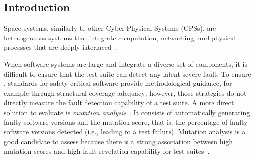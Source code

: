 \subsection{Introduction}

Space systems, similarly to other Cyber Physical Systems (CPSs), are heterogeneous systems that integrate computation, networking, and physical processes that are deeply interlaced~\cite{Khaitan:2015}. 
 
 When software systems are large and integrate a diverse set of components, it is difficult to ensure that the test suite can detect any latent severe fault. To ensure , standards for safety-critical software provide methodological guidance, for example through structural coverage adequacy; however, those strategies do not directly measure the fault detection capability of a test suite. A more direct solution to evaluate  is \emph{mutation analysis}~\cite{jia2010analysis,papadakis2019mutation}. It consists of automatically generating faulty software versions and %
  the mutation score, that is, the percentage of faulty software versions detected (i.e., leading to a test failure).
 Mutation analysis is a good candidate to assess  because there is a strong association between high mutation scores and high fault revelation capability for test suites~\cite{papadakis2018mutation}. 

